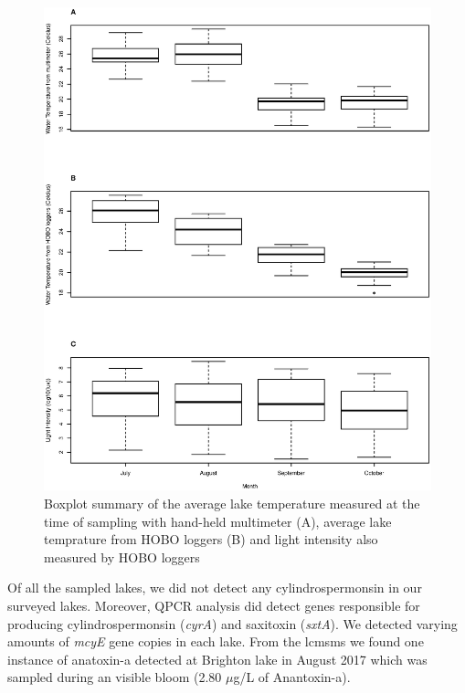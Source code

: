 \begin{figure}
\includegraphics[width=\textwidth]{figures/hobo}
\caption{Boxplot summary of the average lake temperature measured at the time of sampling with hand-held multimeter (A), average lake temprature from HOBO loggers (B) and light intensity also measured by HOBO loggers} 
\label{fig:hobo}
\end{figure}


Of all the sampled lakes, we did not detect any cylindrospermonsin in our surveyed lakes. Moreover,  QPCR analysis did detect genes responsible for producing cylindrospermonsin (\emph{cyrA}) and saxitoxin (\emph{sxtA}). We detected varying amounts of \emph{mcyE} gene copies in each lake.  From the \gls{lcmsms} we found one instance of anatoxin-a detected at Brighton lake in August 2017 which was sampled during an visible bloom (2.80 $\mu$g/L of Anantoxin-a).

